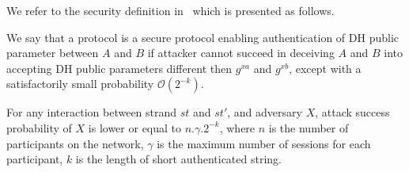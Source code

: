 We refer to the security definition in~\cite{1580514} which is presented as follows. 

\begin{Definition}
We say that a protocol is a secure protocol enabling authentication of DH public parameter between $A$ and $B$ if attacker cannot succeed in deceiving $A$ and $B$ into accepting DH public parameters different then $g^{xa}$ and $g^{xb}$, except with a satisfactorily small probability $\mathcal{O}(2^{-k})$.
\end{Definition}

\begin{Lemma}\label{lemme5.1}

For any interaction between strand $st$ and $st'$, and adversary $X$, attack success probability of $X$ is lower or equal to $n.\gamma.2^{-k}$, 
where $n$ is the number of participants on the network, $\gamma$ is the maximum number of sessions for each participant, $k$ is the length of short authenticated string. 
\end{Lemma}

